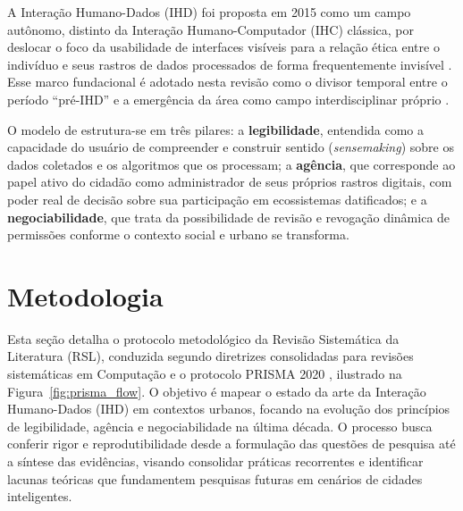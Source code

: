\documentclass[12pt]{article}
\begin{document}
A Interação Humano-Dados (IHD) foi proposta em 2015 como um campo autônomo, distinto da Interação Humano-Computador (IHC) clássica, por deslocar o foco da usabilidade de interfaces visíveis para a relação ética entre o indivíduo e seus rastros de dados processados de forma frequentemente invisível \cite{mortier2015humandatainteractionhumanface}. Esse marco fundacional é adotado nesta revisão como o divisor temporal entre o período ``pré-IHD'' \cite{Mashhadi2014} e a emergência da área como campo interdisciplinar próprio \cite{Sailaja2021Designing}.

O modelo de \cite{mortier2015humandatainteractionhumanface} estrutura-se em três pilares: a \textbf{legibilidade}, entendida como a capacidade do usuário de compreender e construir sentido (\textit{sensemaking}) sobre os dados coletados e os algoritmos que os processam; a \textbf{agência}, que corresponde ao papel ativo do cidadão como administrador de seus próprios rastros digitais, com poder real de decisão sobre sua participação em ecossistemas datificados; e a \textbf{negociabilidade}, que trata da possibilidade de revisão e revogação dinâmica de permissões conforme o contexto social e urbano se transforma.

\section{Metodologia} \label{sec:metodologia}

    Esta seção detalha o protocolo metodológico da Revisão Sistemática da Literatura (RSL), conduzida segundo diretrizes consolidadas para revisões sistemáticas em Computação \cite{KITCHENHAM2013} e o protocolo PRISMA 2020 \cite{prisma2021}, ilustrado na Figura~\ref{fig:prisma_flow}. O objetivo é mapear o estado da arte da Interação Humano-Dados (IHD) em contextos urbanos, focando na evolução dos princípios de legibilidade, agência e negociabilidade na última década. O processo busca conferir rigor e reprodutibilidade desde a formulação das questões de pesquisa até a síntese das evidências, visando consolidar práticas recorrentes e identificar lacunas teóricas que fundamentem pesquisas futuras em cenários de cidades inteligentes.
\end{document}

